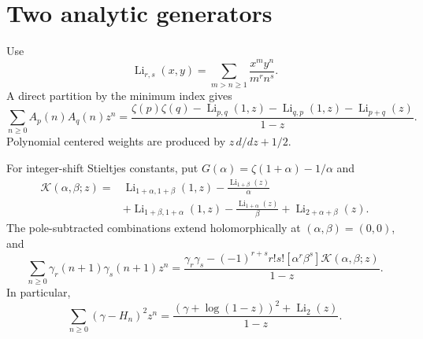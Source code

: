 \section{Two analytic generators}
\label{otc:sec:generators}

Use
\[
 \operatorname{Li}_{r,s}(x,y)
 =\sum_{m>n\ge1}\frac{x^my^n}{m^rn^s}.
\]
A direct partition by the minimum index gives
\begin{equation}
\sum_{n\ge0}A_p(n)A_q(n)z^n
=\frac{\zeta(p)\zeta(q)-\operatorname{Li}_{p,q}(1,z)
-\operatorname{Li}_{q,p}(1,z)-\operatorname{Li}_{p+q}(z)}{1-z}.
\label{otc:eq:tail-generator}
\end{equation}
Polynomial centered weights are produced by
$z\,d/dz+1/2$.

For integer-shift Stieltjes constants, put
$G(\alpha)=\zeta(1+\alpha)-1/\alpha$ and
\begin{align*}
\mathcal K(\alpha,\beta;z)={}&
\operatorname{Li}_{1+\alpha,1+\beta}(1,z)
-\frac{\operatorname{Li}_{1+\beta}(z)}{\alpha}\\
&+\operatorname{Li}_{1+\beta,1+\alpha}(1,z)
-\frac{\operatorname{Li}_{1+\alpha}(z)}{\beta}
+\operatorname{Li}_{2+\alpha+\beta}(z).
\end{align*}
The pole-subtracted combinations extend holomorphically at
$(\alpha,\beta)=(0,0)$, and
\begin{equation}
\sum_{n\ge0}\gamma_r(n+1)\gamma_s(n+1)z^n
=\frac{\gamma_r\gamma_s-(-1)^{r+s}r!s!
[\alpha^r\beta^s]\mathcal K(\alpha,\beta;z)}{1-z}.
\label{otc:eq:stieltjes-generator}
\end{equation}
In particular,
\[
\sum_{n\ge0}(\gamma-H_n)^2z^n
=\frac{(\gamma+\log(1-z))^2+\operatorname{Li}_2(z)}{1-z}.
\]
